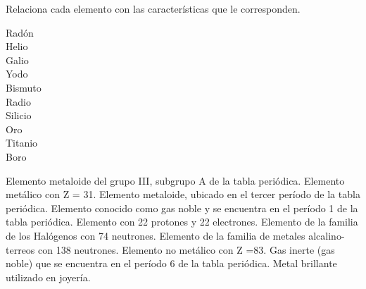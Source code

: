 Relaciona cada elemento con las características que le
corresponden.

\begin{minipage}{0.2\textwidth}
    \begin{parts}
        \fillin[I][1cm] Radón \\[-1em]
        \fillin[D][1cm] Helio\\[-1em]
        \fillin[B][1cm] Galio\\[-1em]
        \fillin[F][1cm] Yodo\\[-1em]
        \fillin[H][1cm] Bismuto\\[-1em]
        \fillin[G][1cm] Radio\\[-1em]
        \fillin[C][1cm] Silicio\\[-1em]
        \fillin[J][1cm] Oro\\[-1em]
        \fillin[E][1cm] Titanio\\[-1em]
        \fillin[A][1cm] Boro\\[-1em]
    \end{parts}
\end{minipage}\hfill
\begin{minipage}{0.7\textwidth}
    \begin{choices}
        \choice Elemento metaloide del grupo III, subgrupo A de la tabla periódica.
        \choice Elemento metálico con Z = 31.
        \choice Elemento metaloide, ubicado en el tercer período de la tabla periódica.
        \choice Elemento conocido como gas noble y se encuentra en el período 1 de la tabla periódica.
        \choice Elemento con 22 protones y 22 electrones.
        \choice Elemento de la familia de los Halógenos con 74 neutrones.
        \choice Elemento de la familia de metales alcalino-terreos con 138 neutrones.
        \choice Elemento no metálico con Z =83.
        \choice Gas inerte (gas noble) que se encuentra en el período 6 de la tabla periódica.
        \choice Metal brillante utilizado en joyería.
    \end{choices}
\end{minipage}
